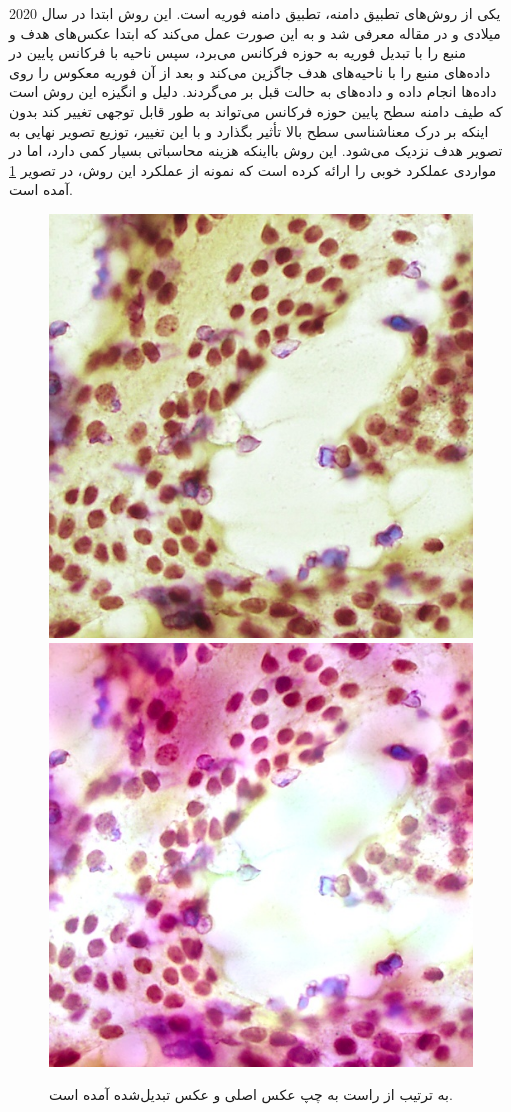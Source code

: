 یکی از روش‌های تطبیق دامنه، تطبیق دامنه فوریه است. این روش ابتدا در سال 2020 میلادی و در مقاله \cite{yang2020fda} معرفی شد و به این صورت عمل می‌کند که ابتدا عکس‌های هدف و منبع را با تبدیل فوریه به حوزه فرکانس می‌برد، سپس ناحیه با فرکانس پایین در داده‌های منبع را با ناحیه‌های هدف جاگزین می‌کند و بعد از آن فوریه معکوس را روی داده‌ها انجام داده و داده‌های به حالت قبل بر می‌گردند. دلیل و انگیزه این روش است که طیف دامنه سطح پایین حوزه فرکانس می‌تواند به طور قابل توجهی تغییر کند بدون اینکه بر درک معناشناسی سطح بالا تأثیر بگذارد و با این تغییر، توزیع تصویر نهایی به تصویر هدف نزدیک می‌شود.
این روش بااینکه هزینه محاسباتی بسیار کمی دارد، اما در مواردی عملکرد خوبی را ارائه کرده است که نمونه از عملکرد این روش، در تصویر \ref{fda augmentation} آمده است.
\begin{figure}
    \begin{center}
        \includegraphics[width=0.48\linewidth]{figs/suggested_methods/subs/data_augmentation/fda_1054-original.jpeg}
        \includegraphics[width=0.48\linewidth]{figs/suggested_methods/subs/data_augmentation/fda_1054-transformed.jpeg}
    \end{center}
    \caption[نمونه‌ای از داده‌افزایی تطبیق دامنه فوریه]{ به ترتیب از راست به چپ عکس اصلی و عکس تبدیل‌شده آمده است.}
    \label{fda augmentation}
\end{figure}

